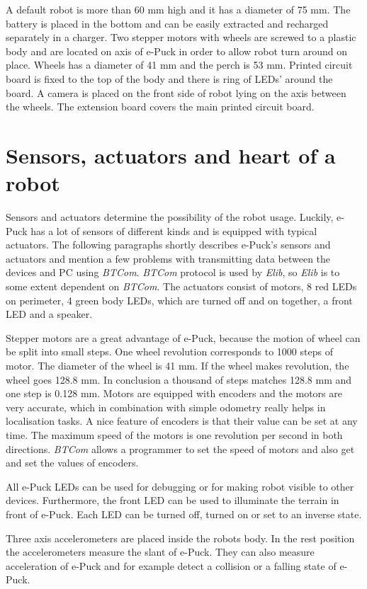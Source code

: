\documentclass[12pt,notitlepage]{report}
\begin{document}
	A default robot is more than 60 mm 
	high and it has a diameter of 75 mm. 
	The battery is placed in the bottom and can be easily extracted and recharged separately in a charger.
	Two stepper motors with wheels are screwed to a plastic body and are located on axis of e-Puck
	in order to allow robot turn around on place. Wheels has a diameter of 41 mm and the perch is 53 mm.
	Printed circuit board is fixed to the top of the body and there is ring of LEDs' around the board.
	A camera is placed on the front side of robot lying on the axis between the wheels.
	The extension board covers the main printed circuit board.
\section{Sensors, actuators and heart of a robot}
	Sensors and actuators determine the possibility of the robot usage.
	Luckily, e-Puck has a lot of sensors of different kinds and is equipped with typical actuators.
	The following paragraphs shortly describes e-Puck's sensors and actuators and mention a few problems 
	with transmitting data between the devices and PC using {\it BTCom}. {\it BTCom} protocol is used by {\it Elib},
	so {\it Elib} is to some extent dependent on {\it BTCom}.
	The actuators consist of motors, 8 red LEDs on perimeter, 4 green body LEDs,
	 which are turned off and on together, a front LED and a speaker.
	 
	Stepper motors are a great advantage of e-Puck, because the motion of wheel can be split
	into small steps. One wheel revolution corresponds to 1000 steps of motor. The 
	diameter of the wheel is 41 mm. If the wheel makes revolution, the wheel goes 128.8 mm. 
	In conclusion a thousand of steps matches 128.8 mm and one step is 0.128 mm. 
	Motors are equipped with encoders and the motors are very accurate, 
	which in combination with simple odometry really helps in localisation tasks.
	A nice feature of encoders is that their value can be set at any time.
	The maximum speed of the motors is one revolution per second in both directions.
	{\it BTCom} allows a programmer to set the speed of motors and also get and set the values
	of encoders.
	 
	All e-Puck LEDs can be used for debugging or for making robot visible to other devices.
	Furthermore, the front LED can be used to illuminate the terrain in front of  e-Puck.
	Each LED can be turned off, turned on or set to an inverse state.
	
	Three axis accelerometers are placed inside the robots body. In the rest position
	the accelerometers measure the slant of e-Puck. They can also measure acceleration of e-Puck
	and for example detect a collision or a falling state of e-Puck. 
	
\end{document}
